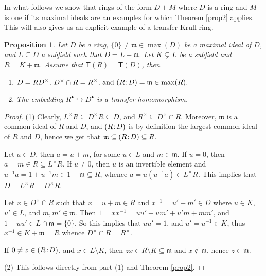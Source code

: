 \documentclass[a4paper, 10pt]{amsart}
\theoremstyle{plain}
\newtheorem{proposition}[theorem]{Proposition}
\theoremstyle{definition}
\theoremstyle{remark}
\newcommand{\DP}{\negthinspace : \negthinspace}
\numberwithin{equation}{section}
\begin{document}
In what follows we show that rings of the form $D+M$ where $D$ is a ring and $M$ is one if its maximal ideals are an examples for which Theorem \ref{prop2} applies.  This will also gives us an explicit example of a transfer Krull ring. 

\begin{proposition}\label{D+m prop}
		Let $D$ be a ring, $\{0\}\ne \mathfrak{m}\in \max(D)$ be a maximal ideal of $D$, and $L\subseteq D$ a subfield such that $D=L+\mathfrak{m}$. Let $K\subsetneq L$ be a subfield and $R=K+\mathfrak{m}$. Assume that $\mathsf{T}(R)=\mathsf{T}(D)$, then
        \begin{enumerate}[label=\textup(\normalfont\arabic*\textup)]
            \item $D=RD^{\times},\, D^{\times} \cap R= R^{\times},  \, \text{and}\,\, (R\DP D)=\mathfrak{m}\in \max(R).$
            \item The embedding $R^\bullet \hookrightarrow D^\bullet$ is a  transfer homomorphism.
        \end{enumerate}
	\end{proposition}	

    \begin{proof}
        (1) Clearly, $L^\times R\subseteq D^\times R\subseteq D$, and $R^\times \subseteq D^\times \cap R$. Moreover, $\mathfrak{m}$ is a common ideal of $R$ and $D$, and $(R\DP D)$ is by definition the largest common ideal of $R$ and $D$, hence we get that $\mathfrak{m}\subseteq (R\DP D)\subseteq R$. 
			
			Let $a\in D$, then $a=u+m$, for some $u\in L$ and $m\in \mathfrak{m}$. If $u=0$, then $a=m\in R\subseteq L^\times R$. If $u\ne 0$, then $u$ is an invertible element 
			and $u^{-1}a=1+u^{-1}m\in 1+\mathfrak{m}\subseteq R$, whence $a =u(u^{-1}a)\in L^\times R$. This implies that $D=L^\times R=D^\times R$.
			
			Let $x\in D^\times \cap R$ such that $x=u+m \in R$ and $x^{-1}=u'+m' \in D$ where $u\in K$, $u'\in L$, and $m,m'\in \mathfrak{m}$. Then $1=xx^{-1}=uu'+um'+u'm+mm'$, and $1-uu'\in L\cap \mathfrak{m}=\{0\}.$ 
			So this implies that $uu'=1$, and $u'=u^{-1}\in K$, thus $x^{-1}\in K+\mathfrak{m}=R$ whence $D^{\times} \cap R= R^{\times}$.
			
			If $0\ne z\in (R\DP D)$, and $x\in L\setminus K$, then $zx\in R\setminus K\subseteq \mathfrak{m}$ and $x\notin \mathfrak{m}$, hence $z\in \mathfrak{m}$. 

            (2) This follows directly from part (1) and Theorem \ref{prop2}.
    \end{proof}
	
\end{document}
